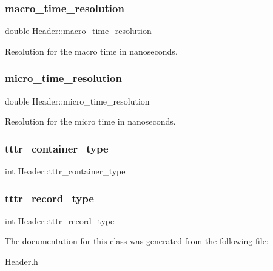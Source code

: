 \subsubsection{\texorpdfstring{macro\+\_\+time\+\_\+resolution}{macro\_time\_resolution}}
{\footnotesize\ttfamily double Header\+::macro\+\_\+time\+\_\+resolution}



Resolution for the macro time in nanoseconds. 

\mbox{\label{class_header_a8fa62f3387498cc02299aa4b469b61c8}} 
\subsubsection{\texorpdfstring{micro\+\_\+time\+\_\+resolution}{micro\_time\_resolution}}
{\footnotesize\ttfamily double Header\+::micro\+\_\+time\+\_\+resolution}



Resolution for the micro time in nanoseconds. 

\mbox{\label{class_header_a67518ee8258bc7004cd4f375fbc10623}} 
\subsubsection{\texorpdfstring{tttr\+\_\+container\+\_\+type}{tttr\_container\_type}}
{\footnotesize\ttfamily int Header\+::tttr\+\_\+container\+\_\+type\hspace{0.3cm}{\ttfamily [protected]}}

\mbox{\label{class_header_a1bb0274b16efc366c616612c95d23f09}} 
\subsubsection{\texorpdfstring{tttr\+\_\+record\+\_\+type}{tttr\_record\_type}}
{\footnotesize\ttfamily int Header\+::tttr\+\_\+record\+\_\+type}



The documentation for this class was generated from the following file\+:\begin{DoxyCompactItemize}
\item 
\hyperlink{_header_8h}{Header.\+h}\end{DoxyCompactItemize}
